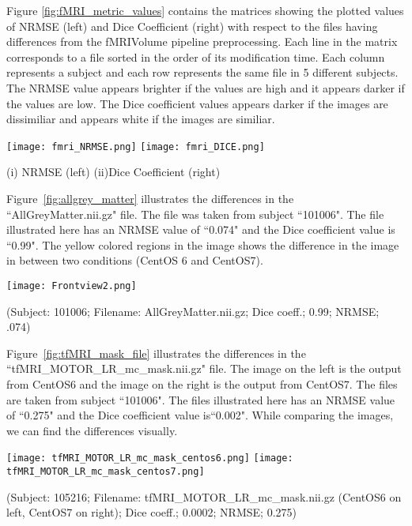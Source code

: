 Figure \ref{fig:fMRI_metric_values} contains the matrices showing the plotted values of NRMSE (left) and Dice Coefficient (right) with respect to the files having differences from the fMRIVolume pipeline preprocessing. Each line in the matrix corresponds to a file sorted in the order of its modification time. Each column represents a subject and each row represents the same file in 5 different subjects. The NRMSE value appears brighter if the values are high and it appears darker if the values are low. The Dice coefficient values appears darker if the images are dissimiliar and appears white if the images are similiar.

\hfill \break
\begin{center}
\texttt{[image: fmri\_NRMSE.png]}%
\texttt{[image: fmri\_DICE.png]}
\caption*{(i) NRMSE (left) (ii)Dice Coefficient (right)}
\label{fig:fMRI_metric_values}
\end{center}
\hfill \break

Figure~\ref{fig:allgrey_matter} illustrates the differences in the ``AllGreyMatter.nii.gz" file. The file was taken from subject ``101006". The file illustrated here has an NRMSE value of ``0.074" and the Dice coefficient value is ``0.99". The yellow colored regions in the image shows the difference in the image in between two conditions (CentOS 6 and CentOS7).

\hfill \break
\begin{center}
\texttt{[image: Frontview2.png]}%
\caption*{(Subject: 101006; Filename: AllGreyMatter.nii.gz; Dice coeff.; 0.99; NRMSE; .074)}
\label{fig:allgrey_matter} 
\end{center}
\hfill \break

Figure~\ref{fig:tfMRI_mask_file} illustrates the differences in the ``tfMRI\_MOTOR\_LR\_mc\_mask.nii.gz" file. The image on the left is the output from CentOS6 and the image on the right is the output from CentOS7. The files are taken from subject ``101006". The files illustrated here has an NRMSE value of ``0.275" and the Dice coefficient value is``0.002". While comparing the images, we can find the differences visually.

\hfill \break
\begin{center}
\texttt{[image: tfMRI\_MOTOR\_LR\_mc\_mask\_centos6.png]}%
\texttt{[image: tfMRI\_MOTOR\_LR\_mc\_mask\_centos7.png]}
\caption*{(Subject: 105216; Filename: tfMRI\_MOTOR\_LR\_mc\_mask.nii.gz (CentOS6 on left, CentOS7 on right); Dice coeff.; 0.0002; NRMSE; 0.275)}
\label{fig:tfMRI_mask_file}
\end{center}
\hfill \break


